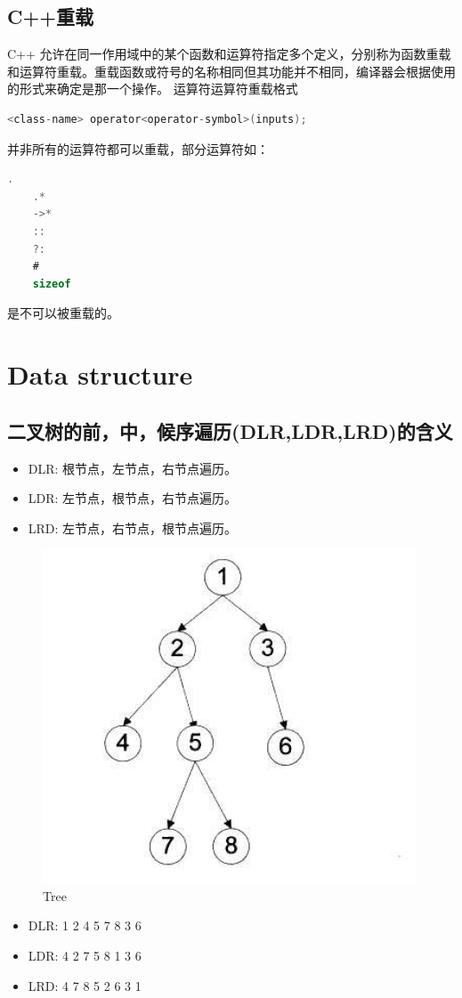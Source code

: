 \documentclass[12pt,twoside]{report}
\begin{document}
\section{C++重载}
C++ 允许在同一作用域中的某个函数和运算符指定多个定义，分别称为函数重载和运算符重载。重载函数或符号的名称相同但其功能并不相同，编译器会根据使用的形式来确定是那一个操作。
运算符运算符重载格式
\begin{lstlisting}[language=C]
    <class-name> operator<operator-symbol>(inputs);
\end{lstlisting}
并非所有的运算符都可以重载，部分运算符如：
\begin{lstlisting}[language=C]
    .
    .*
    ->*
    ::
    ?:
    #
    sizeof
\end{lstlisting}
是不可以被重载的。

\chapter{Data structure}
\section{二叉树的前，中，候序遍历(DLR,LDR,LRD)的含义}
\begin{itemize}
    \item DLR: 根节点，左节点，右节点遍历。
    \item LDR: 左节点，根节点，右节点遍历。
    \item LRD: 左节点，右节点，根节点遍历。
\end{itemize}

\begin{figure}[H]
    \centering  
	\includegraphics[width=0.3\linewidth]{pic/tree}  
	\caption{Tree}  
\end{figure}

\begin{itemize}
    \item DLR: 1 2 4 5 7 8 3 6
    \item LDR: 4 2 7 5 8 1 3 6
    \item LRD: 4 7 8 5 2 6 3 1
\end{itemize}
\end{document}
